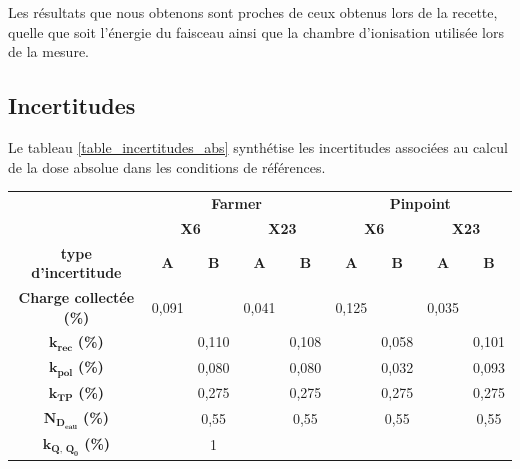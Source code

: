 \documentclass{article}
\begin{document}
Les résultats que nous obtenons sont proches de ceux obtenus lors de la recette, quelle que soit l'énergie du faisceau ainsi que la chambre d'ionisation utilisée lors de la mesure.

\newpage
\subsection{Incertitudes}

Le tableau \ref*{table_incertitudes_abs} synthétise les incertitudes associées au calcul de la dose absolue dans les conditions de références.

\begin{table}[h]
  \centering
  \begin{tabular}{c|cccc|cccc|}
  \cline{2-9}
   &
    \multicolumn{4}{c|}{\textbf{Farmer}} &
    \multicolumn{4}{c|}{\textbf{Pinpoint}} \\ \cline{2-9} 
   &
    \multicolumn{2}{c|}{\textbf{X6}} &
    \multicolumn{2}{c|}{\textbf{X23}} &
    \multicolumn{2}{c|}{\textbf{X6}} &
    \multicolumn{2}{c|}{\textbf{X23}} \\ \hline
  \multicolumn{1}{|c|}{\textbf{type d'incertitude}} &
    \textbf{A} &
    \multicolumn{1}{c|}{\textbf{B}} &
    \textbf{A} &
    \textbf{B} &
    \textbf{A} &
    \multicolumn{1}{c|}{\textbf{B}} &
    \textbf{A} &
    \textbf{B} \\
  \multicolumn{1}{|c|}{\textbf{Charge collectée (\%)}} &
    0,091 &
    \multicolumn{1}{c|}{} &
    0,041 &
     &
    0,125 &
    \multicolumn{1}{c|}{} &
    0,035 &
     \\
  \multicolumn{1}{|c|}{$\mathbf{k_{rec}}$ \textbf{(\%)}} &
     &
    \multicolumn{1}{c|}{0,110} &
     &
    0,108 &
     &
    \multicolumn{1}{c|}{0,058} &
     &
    0,101 \\
  \multicolumn{1}{|c|}{$\mathbf{k_{pol}}$ \textbf{(\%)}} &
     &
    \multicolumn{1}{c|}{0,080} &
     &
    0,080 &
     &
    \multicolumn{1}{c|}{0,032} &
     &
    0,093 \\
  \multicolumn{1}{|c|}{$\mathbf{k_{TP}}$ \textbf{(\%)}} &
     &
    \multicolumn{1}{c|}{0,275} &
     &
    0,275 &
     &
    \multicolumn{1}{c|}{0,275} &
     &
    0,275 \\
  \multicolumn{1}{|c|}{$\mathbf{N_{D_{eau}}}$ \textbf{(\%)}} &
     &
    \multicolumn{1}{c|}{0,55} &
     &
    0,55 &
     &
    \multicolumn{1}{c|}{0,55} &
     &
    0,55 \\
  \multicolumn{1}{|c|}{$\mathbf{k_{Q,\, Q_0}}$ \textbf{(\%)}} &
     &
    \multicolumn{1}{c|}{1} &

\end{tabular}
\end{table}
\end{document}
